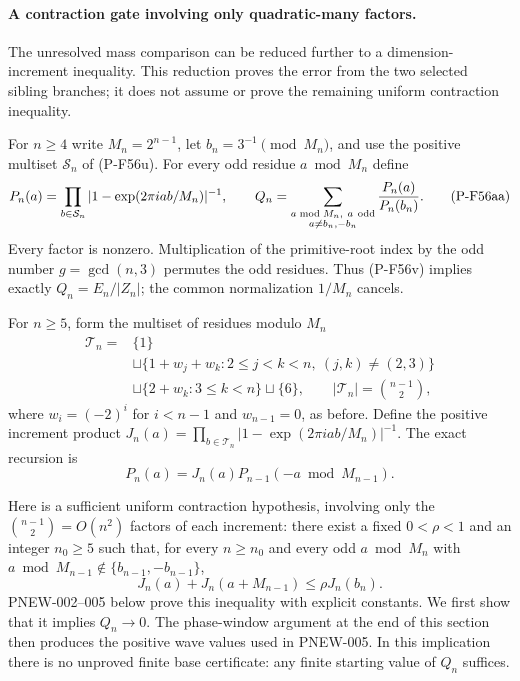 \paragraph{A contraction gate involving only quadratic-many factors.}
The unresolved mass comparison can be reduced further to a
dimension-increment inequality. This reduction proves the error
from the two selected sibling branches; it does not assume or
prove the remaining uniform contraction inequality.

For $n\ge4$ write $M_n=2^{n-1}$, let
$b_n=3^{-1}\pmod {M_n}$, and use the positive multiset
$\mathcal S_n$ of (P-F56u). For every odd residue $a\bmod M_n$
define
\[
 P_n(a)=
 \prod_{b\in\mathcal S_n}
       |1-\exp(2\pi iab/M_n)|^{-1},\qquad
 Q_n=\sum_{\substack{a\bmod M_n,\ a\ {\rm odd}\\
                               a\ne b_n,-b_n}}
                              \frac{P_n(a)}{P_n(b_n)}.
 \tag{P-F56aa}
\]
Every factor is nonzero. Multiplication of the primitive-root
index by the odd number $g=\gcd(n,3)$ permutes the odd residues.
Thus (P-F56v) implies exactly $Q_n=E_n/|Z_n|$; the common
normalization $1/M_n$ cancels.

For $n\ge5$, form the multiset of residues modulo $M_n$
\[
 \begin{split}
 \mathcal T_n={}&\{1\}\\
 &\sqcup\{1+w_j+w_k:2\le j<k<n,\ (j,k)\ne(2,3)\}\\
 &\sqcup\{2+w_k:3\le k<n\}\sqcup\{6\},
 \qquad |\mathcal T_n|=\binom{n-1}2,
 \end{split}
 \tag{P-F56ab}
\]
where $w_i=(-2)^i$ for $i<n-1$ and $w_{n-1}=0$,
as before. Define the positive increment product
$J_n(a)=\prod_{b\in\mathcal T_n}
 |1-\exp(2\pi iab/M_n)|^{-1}$.
The exact recursion is
\[
             P_n(a)=J_n(a)P_{n-1}(-a\bmod M_{n-1}).
 \tag{P-F56ac}
\]

Here is a sufficient uniform contraction hypothesis, involving
only the $\binom{n-1}2=O(n^2)$ factors of each increment:
there exist a fixed $0<\rho<1$ and an integer $n_0\ge5$ such that,
for every $n\ge n_0$ and every odd $a\bmod M_n$ with
$a\bmod M_{n-1}\notin\{b_{n-1},-b_{n-1}\}$,
\[
 J_n(a)+J_n(a+M_{n-1})\le \rho J_n(b_n).
 \tag{P-F56ad}
\]
PNEW-002--005 below prove this inequality with explicit constants.
We first show that it implies $Q_n\longrightarrow0$. The phase-window
argument at the end of this section then produces the positive
wave values used in PNEW-005.
In this implication there is no unproved finite base
certificate: any finite starting value of $Q_n$ suffices.

